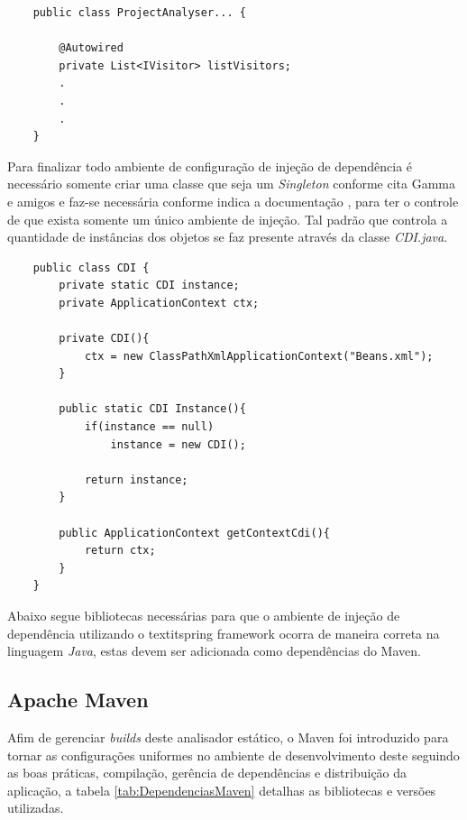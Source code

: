 \begin{lstlisting}
	public class ProjectAnalyser... {

		@Autowired
		private List<IVisitor> listVisitors;
		.
		.
		.
	}
\end{lstlisting}

Para finalizar todo ambiente de configuração de injeção de dependência é necessário somente criar uma classe que seja um {\it Singleton} \cite{Gamma:1995} conforme cita Gamma e amigos e faz-se necessária conforme indica a documentação \cite{SPRING_REF}, para ter o controle de que exista somente um único ambiente de injeção. Tal padrão que controla a quantidade de instâncias dos objetos se faz presente através da classe \textit{CDI.java}.
\begin{lstlisting}
	public class CDI {
		private static CDI instance;
		private ApplicationContext ctx;
		
		private CDI(){ 
			ctx = new ClassPathXmlApplicationContext("Beans.xml");
		}
		
		public static CDI Instance(){
			if(instance == null)
				instance = new CDI();
		
			return instance;
		}
		
		public ApplicationContext getContextCdi(){
			return ctx;
		}
	}
\end{lstlisting}

Abaixo segue bibliotecas necessárias para que o ambiente de injeção de dependência utilizando o textit{spring framework} \cite{SPRING_REF} ocorra de maneira correta na linguagem \textit{Java}, estas devem ser adicionada como dependências do Maven.


\subsection{Apache Maven}
Afim de gerenciar \textit{builds} deste analisador estático, o Maven foi introduzido para tornar as configurações uniformes no ambiente de desenvolvimento deste seguindo as boas práticas, compilação, gerência de dependências e distribuição da aplicação, a tabela \ref{tab:DependenciasMaven} detalhas as bibliotecas e versões utilizadas.



